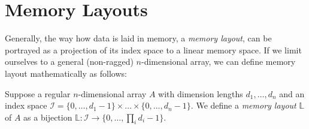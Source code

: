 \section{Memory Layouts}





Generally, the way how data is laid in memory, a \emph{memory layout}, can be portrayed as a projection of its index space to a linear memory space. If we limit ourselves to a general (non-ragged) $n$-dimensional array, we can define memory layout mathematically as follows:

\begin{defn}
  \label{def:layout}
  Suppose a regular $n$-dimensional array $A$ with dimension lengths $d_1, \dots, d_n$ and an index space $\mathcal{I} = \{0,\dots,d_1 - 1\}\times \dots \times \{0,\dots,d_n - 1\}$. We define a \emph{memory layout} $\mathbb{L}$ of $A$ as a bijection $\mathbb{L}: \mathcal{I} \to \{0,\dots, \prod_{i}d_i - 1\}$. 
\end{defn}


